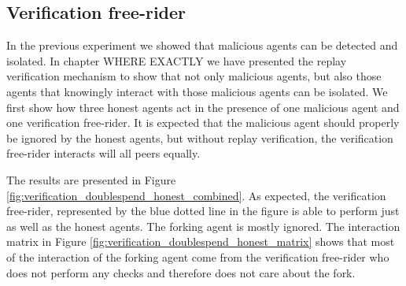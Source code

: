 \subsection{Verification free-rider}
In the previous experiment we showed that malicious agents can be detected and isolated. In chapter
{\color{red} WHERE EXACTLY} we have presented the replay verification mechanism to show that not 
only malicious agents, but also those agents that knowingly interact with those malicious agents can
be isolated. We first show how three honest agents act in the presence of one malicious agent and
one verification free-rider. It is expected that the malicious agent should properly be ignored by
the honest agents, but without replay verification, the verification free-rider interacts will all 
peers equally. 

The results are presented in Figure \ref{fig:verification_doublespend_honest_combined}. As expected,
the verification free-rider, represented by the blue dotted line in the figure is able to perform 
just as well as the honest agents. The forking agent is mostly ignored. The interaction matrix in 
Figure \ref{fig:verification_doublespend_honest_matrix} shows that most of the interaction of the 
forking agent come from the verification free-rider who does not perform any checks and therefore 
does not care about the fork.

